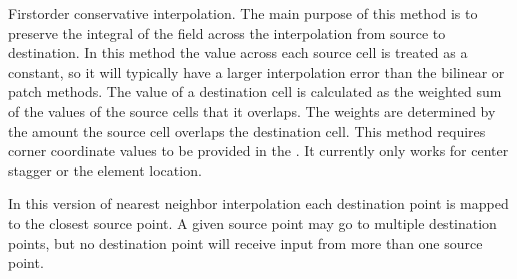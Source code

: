 \documentclass[letterpaper,10pt,english]{sphinxmanual}
\begin{document}
\begin{fulllineitems}
\begin{fulllineitems}
\end{fulllineitems}


\begin{fulllineitems}
\label{\detokenize{RegridMethod:ESMF.api.constants.RegridMethod.CONSERVE}}
First\sphinxhyphen{}order conservative interpolation. The main purpose of this method is 
to preserve the integral of the field across the interpolation from source 
to destination. In this method the value across each source cell is treated 
as a constant, so it will typically have a larger interpolation error than 
the bilinear or patch methods.  The value of a destination cell 
is calculated as the weighted sum of the values of the source cells that it 
overlaps. The weights are determined by the amount the source cell overlaps 
the destination cell. This method requires corner coordinate values to be 
provided in the {\hyperref[\detokenize{grid:ESMF.api.grid.Grid}]{}}. It currently only works for 
 center stagger or 
the {\hyperref[\detokenize{mesh:ESMF.api.mesh.Mesh}]{}} element location.

\end{fulllineitems}


\begin{fulllineitems}
\label{\detokenize{RegridMethod:ESMF.api.constants.RegridMethod.NEAREST_STOD}}
In this version of nearest neighbor interpolation each destination point is 
mapped to the closest source point. A given source point may go to multiple 
destination points, but no destination point will receive input from more 
than one source point.

\end{fulllineitems}


\end{fulllineitems}
\end{document}
